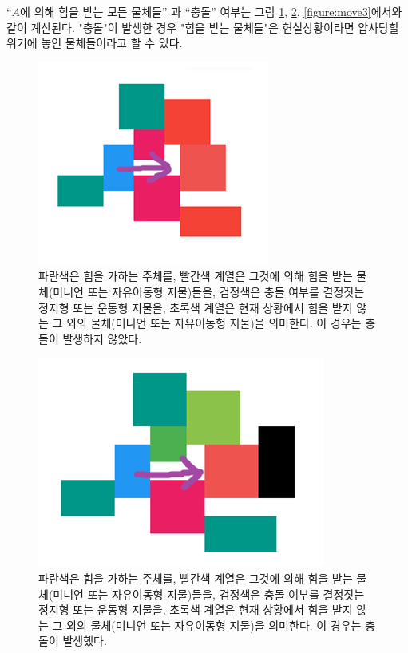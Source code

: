 \documentclass[a4paper,12pt]{article}
\begin{document}
“$A$에 의해 힘을 받는 모든 물체들” 과 “충돌” 여부는 그림 \ref{figure:move1}, \ref{figure:move2}, \ref{figure:move3}에서와 같이 계산된다. "충돌"이 발생한 경우 "힘을 받는 물체들"은 현실상황이라면 압사당할 위기에 놓인 물체들이라고 할 수 있다.
\begin{figure}[h]
	\centering
	\includegraphics[scale=0.9]{move1.png}
	\caption{ 파란색은 힘을 가하는 주체를, 빨간색 계열은 그것에 의해 힘을 받는 물체(미니언 또는 자유이동형 지물)들을, 검정색은 충돌 여부를 결정짓는 정지형 또는 운동형 지물을, 초록색 계열은 현재 상황에서 힘을 받지 않는 그 외의 물체(미니언 또는 자유이동형 지물)을 의미한다. 이 경우는 충돌이 발생하지 않았다.}
	\label{figure:move1}
\end{figure} 
\begin{figure}[h]
	\centering
	\includegraphics[scale=0.7]{move2.png}
	\caption{ 파란색은 힘을 가하는 주체를, 빨간색 계열은 그것에 의해 힘을 받는 물체(미니언 또는 자유이동형 지물)들을, 검정색은 충돌 여부를 결정짓는 정지형 또는 운동형 지물을, 초록색 계열은 현재 상황에서 힘을 받지 않는 그 외의 물체(미니언 또는 자유이동형 지물)을 의미한다. 이 경우는 충돌이 발생했다.}
	\label{figure:move2}
\end{figure} 
\end{document}
